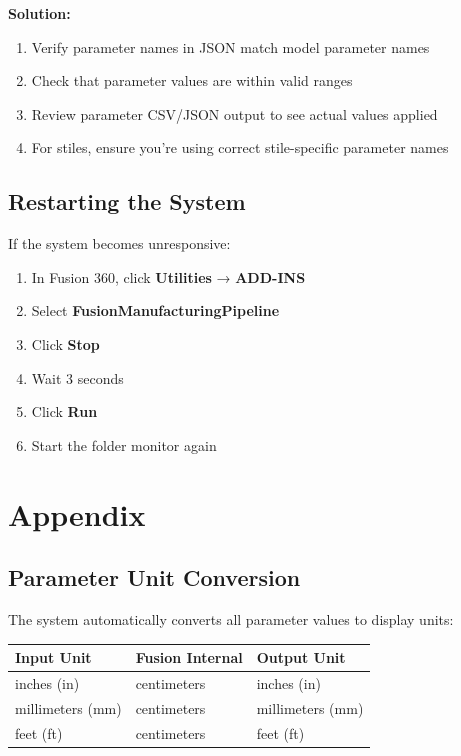 \documentclass[11pt,letterpaper]{article}
\begin{document}
\begin{tcolorbox}[colback=red!5!white,colframe=red!75!black,title=Problem: Parameters not updating correctly]
\textbf{Solution:}
\begin{enumerate}[noitemsep]
    \item Verify parameter names in JSON match model parameter names
    \item Check that parameter values are within valid ranges
    \item Review parameter CSV/JSON output to see actual values applied
    \item For stiles, ensure you're using correct stile-specific parameter names
\end{enumerate}
\end{tcolorbox}

\subsection{Restarting the System}

If the system becomes unresponsive:

\begin{enumerate}
    \item In Fusion 360, click \textbf{Utilities} → \textbf{ADD-INS}
    \item Select \textbf{FusionManufacturingPipeline}
    \item Click \textbf{Stop}
    \item Wait 3 seconds
    \item Click \textbf{Run}
    \item Start the folder monitor again
\end{enumerate}

\section{Appendix}

\subsection{Parameter Unit Conversion}

The system automatically converts all parameter values to display units:

\begin{center}
\begin{tabular}{|l|l|l|}
\hline
\textbf{Input Unit} & \textbf{Fusion Internal} & \textbf{Output Unit} \\
\hline
inches (in) & centimeters & inches (in) \\
millimeters (mm) & centimeters & millimeters (mm) \\
feet (ft) & centimeters & feet (ft) \\
\hline
\end{tabular}
\end{center}
\end{document}
